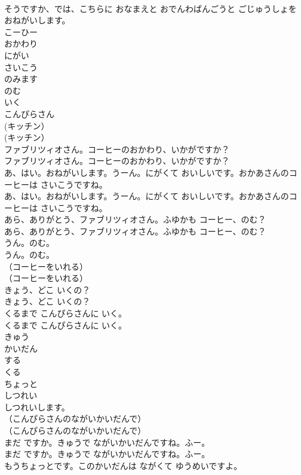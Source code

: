 \documentclass[8pt]{extreport}
\begin{document}
\begin{CJK}{UTF8}{min}
\\	そうですか、では、こちらに おなまえと おでんわばんごうと ごじゅうしょを おねがいします。 
\\	こーひー
\\	おかわり
\\	にがい
\\	さいこう
\\	のみます
\\	のむ
\\	いく
\\	こんぴらさん
\\	(キッチン）	
\\	(キッチン） 
\\	ファブリツィオさん。コーヒーのおかわり、いかがですか？	
\\	ファブリツィオさん。コーヒーのおかわり、いかがですか？ 
\\	あ、はい。おねがいします。うーん。にがくて おいしいです。おかあさんのコーヒーは さいこうですね。	
\\	あ、はい。おねがいします。うーん。にがくて おいしいです。おかあさんのコーヒーは さいこうですね。 
\\	あら、ありがとう、ファブリツィオさん。ふゆかも コーヒー、のむ？	
\\	あら、ありがとう、ファブリツィオさん。ふゆかも コーヒー、のむ？ 
\\	うん。のむ。	
\\	うん。のむ。 
\\	（コーヒーをいれる）	
\\	（コーヒーをいれる） 
\\	きょう、どこ いくの？	
\\	きょう、どこ いくの？ 
\\	くるまで こんぴらさんに いく。	
\\	くるまで こんぴらさんに いく。 
\\	きゅう
\\	かいだん
\\	する
\\	くる
\\	ちょっと
\\	しつれい
\\	しつれいします。
\\	（こんぴらさんのながいかいだんで）	
\\	（こんぴらさんのながいかいだんで） 
\\	まだ ですか。きゅうで ながいかいだんですね。ふー。	
\\	まだ ですか。きゅうで ながいかいだんですね。ふー。 
\\	もうちょっとです。このかいだんは ながくて ゆうめいですよ。	

\end{CJK}
\end{document}
